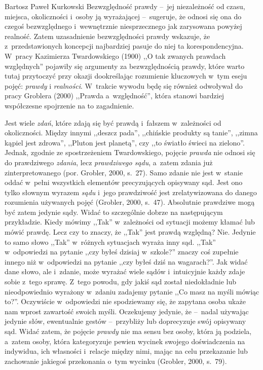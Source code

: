 \begin{artplenv}{Bartosz Paweł Kurkowski}
Bezwzględność prawdy --~jej niezależność od czasu, miejsca, okoliczności i~osoby ją wyrażającej --~sugeruje, że odnosi się
ona do czegoś bezwzględnego i~wewnętrznie niesprzecznego jak zarysowana powyżej realność. Zatem uzasadnienie
bezwzględności prawdy wskazuje, że z~przedstawionych koncepcji najbardziej pasuje do niej ta korespondencyjna. W~pracy
Kazimierza Twardowskiego \label{ref:RNDRjPn6HmkuC}(1900)  ,,O tak zwanych prawdach względnych'' pojawiły się argumenty za
bezwzględnością prawdy, które warto tutaj przytoczyć przy okazji dookreślając rozumienie kluczowych w~tym eseju pojęć:
\textit{prawdy }i \textit{realności}. W~trakcie wywodu będę się również odwoływał do pracy Groblera 
\label{ref:RNDfbFxh0OKqT}(2000) ,,Prawda a~względność'', która stanowi bardziej współczesne spojrzenie na to
zagadnienie.


Jest wiele \textit{zdań}, które zdają się być prawdą i~fałszem w~zależności od okoliczności. Między innymi ,,deszcz
pada'', ,,chińskie produkty są tanie'', ,,zimna kąpiel jest zdrowa'', ,,Pluton jest planetą'', czy ,,to światło świeci na
zielono''. Jednak, zgodnie ze spostrzeżeniem Twardowskiego, pojęcie \textit{prawda }nie odnosi się do prawdziwego
\textit{zdania}, lecz \textit{prawdziwego sądu}, a~zatem zdania już zinterpretowanego \label{ref:RNDDhjOUpeyMs}(por.
Grobler, 2000, s.~27). Samo zdanie nie jest w~stanie oddać w~pełni wszystkich elementów precyzujących opisywany sąd.
Jest ono tylko słownym wyrazem \textit{sądu} i~jego prawdziwość jest zrelatywizowana do danego rozumienia używanych
pojęć \label{ref:RNDvgSs5CBmMp}(Grobler, 2000, s.~47). Absolutnie prawdziwe mogą być zatem jedynie sądy. Widać to
szczególnie dobrze na następującym przykładzie. Kiedy mówimy ,,Tak'' w~zależności od sytuacji możemy kłamać lub mówić
prawdę. Lecz czy to znaczy, że ,,Tak'' jest prawdą względną? Nie. Jedynie to samo słowo ,,Tak'' w~różnych sytuacjach wyraża
inny sąd. ,,Tak'' w~odpowiedzi na pytanie ,,czy byłeś dzisiaj w~szkole?'' znaczy coś zupełnie innego niż w~odpowiedzi na
pytanie ,,czy byłeś dziś na wagarach?''. Jak widać dane słowo, ale i~zdanie, może wyrażać wiele sądów i~intuicyjnie każdy
zdaje sobie z~tego sprawę. Z~tego powodu, gdy jakiś sąd został niedokładnie lub nieodpowiednio wyrażony w~zdaniu
zadajemy pytanie ,,Co masz na myśli mówiąc to?''. Oczywiście w~odpowiedzi nie spodziewamy się, że zapytana osoba ukaże
nam wprost zawartość swoich myśli. Oczekujemy jedynie, że --~nadal używając jedynie słów, ewentualnie gestów --~przybliży
lub doprecyzuje swój opisywany sąd. Widać zatem, że pojęcie \textit{prawdy }nie ma sensu bez osoby, która ją podziela,
a~zatem osoby, która kategoryzuje pewien wycinek swojego doświadczenia na indywidua, ich własności i~relacje między
nimi, mając na celu przekazanie lub zachowanie jakiegoś przekonania o~tym wycinku \label{ref:RNDqOfcsLjgfT}(Grobler,
2000, s.~79).



\end{artplenv}
